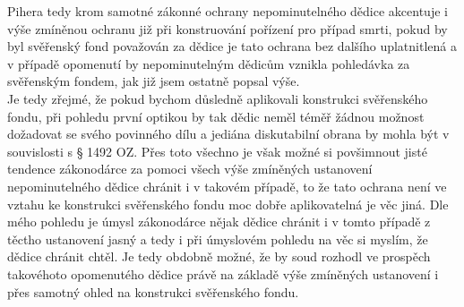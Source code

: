 \documentclass{article}
\begin{document}
 Pihera tedy krom samotné zákonné ochrany nepominutelného dědice akcentuje i výše zmíněnou ochranu již při konstruování pořízení pro případ smrti, pokud by byl svěřenský fond považován za dědice je tato ochrana bez dalšího uplatnitlená a v případě opomenutí by nepominutelným dědicům vznikla pohledávka za svěřenským fondem, jak již jsem ostatně popsal výše.\\
 
 






Je tedy zřejmé, že pokud bychom důsledně aplikovali konstrukci svěřenského fondu, při pohledu první optikou by tak dědic neměl téměř žádnou možnost dožadovat se svého povinného dílu a jediána diskutabilní obrana by mohla být v souvislosti s § 1492 OZ. Přes toto všechno je však možné si povšimnout jisté tendence zákonodárce za pomoci všech výše zmíněných ustanovení nepominutelného dědice chránit i v takovém případě, to že tato ochrana není ve vztahu ke konstrukci svěřenského fondu moc dobře aplikovatelná je věc jiná. Dle mého pohledu je úmysl zákonodárce nějak dědice chránit i v tomto případě z těctho ustanovení jasný a tedy i při úmyslovém pohledu na věc si myslím, že dědice chránit chtěl. Je tedy obdobně možné, že by soud rozhodl ve prospěch takovéhoto opomenutého dědice právě na základě výše zmíněných ustanovení i přes samotný ohled na konstrukci svěřenského fondu.\\
\end{document}
